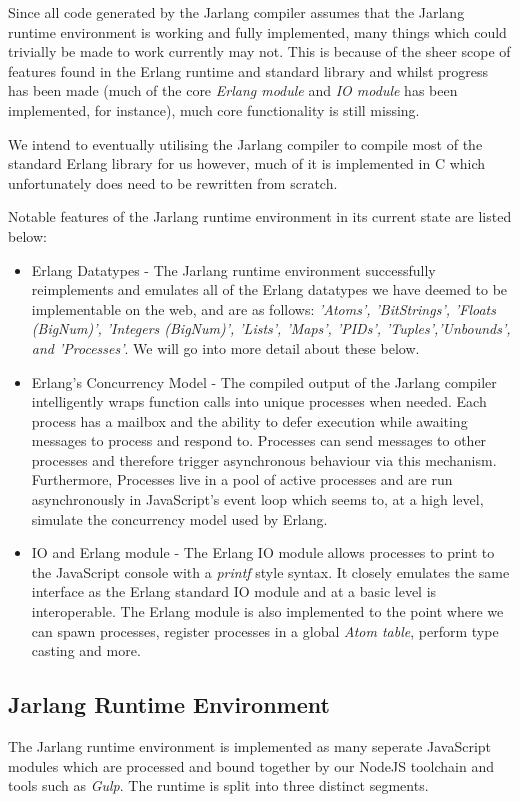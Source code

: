 \documentclass[twoside,12pt,titlepage,a4paper]{article}
\begin{document}
Since all code generated by the Jarlang compiler assumes that the Jarlang runtime environment is working and fully implemented, many things which could trivially be made to work currently may not. This is because of the sheer scope of features found in the Erlang runtime and standard library and whilst progress has been made (much of the core \textit{Erlang module} and \textit{IO module} has been implemented, for instance), much core functionality is still missing.

We intend to eventually utilising the Jarlang compiler to compile most of the standard Erlang library for us however, much of it is implemented in C which unfortunately does need to be rewritten from scratch. 

Notable features of the Jarlang runtime environment in its current state are listed below:

\begin{itemize}
\item Erlang Datatypes - The Jarlang runtime environment successfully reimplements and emulates all of the Erlang datatypes we have deemed to be implementable on the web, and are as follows: \textit{'Atoms', 'BitStrings', 'Floats (BigNum)', 'Integers (BigNum)', 'Lists', 'Maps', 'PIDs', 'Tuples','Unbounds', and 'Processes'}. We will go into more detail about these below.
\item Erlang's Concurrency Model - The compiled output of the Jarlang compiler intelligently wraps function calls into unique processes when needed. Each process has a mailbox and the ability to defer execution while awaiting messages to process and respond to. Processes can send messages to other processes and therefore trigger asynchronous behaviour via this mechanism. Furthermore, Processes live in a pool of active processes and are run asynchronously in JavaScript's event loop which seems to, at a high level, simulate the concurrency model used by Erlang.
\item IO and Erlang module - The Erlang IO module allows processes to print to the JavaScript console with a \textit{printf} style syntax. It closely emulates the same interface as the Erlang standard IO module and at a basic level is interoperable. The Erlang module is also implemented to the point where we can spawn processes, register processes in a global \textit{Atom table}, perform type casting and more.
\end{itemize}

\subsection{Jarlang Runtime Environment}
The Jarlang runtime environment is implemented as many seperate JavaScript modules which are processed and bound together by our NodeJS toolchain and tools such as \textit{Gulp}. The runtime is split into three distinct segments.
\end{document}
